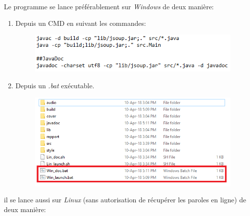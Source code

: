 \documentclass[a4paper,12pt]{report} %
\begin{document}
	Le programme se lance préférablement sur \textit{Windows} de deux manière:
	
	\begin{enumerate}
   		\item Depuis un CMD en suivant les commandes:
   			\begin{figure}[ht] 		
				\centering
  				\includegraphics{exe_CMD}
			\end{figure}
			
   		\item Depuis un \textit{.bat} exécutable.
   			\begin{figure}[ht] 		
				\centering
  				\includegraphics[scale=0.7]{bat}
			\end{figure} 
	\end{enumerate}
	
	il se lance aussi sur \textit{Linux} (sans autorisation de récupérer les paroles en ligne) de deux manière:
\end{document}
